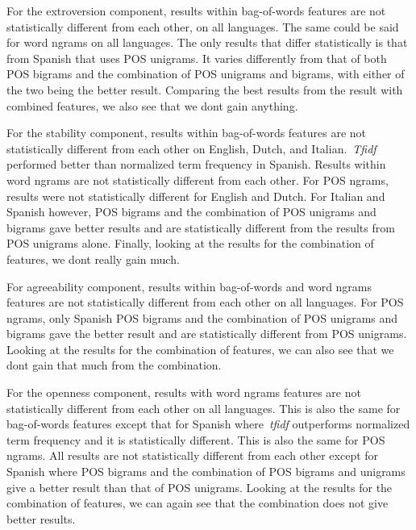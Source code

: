 \documentclass[a4paper]{llncs}
\begin{document}
For the extroversion component, results within bag-of-words features are not statistically different from each other, on all languages. The same could be said for word ngrams on all languages. The only results that differ statistically is that from Spanish that uses POS unigrams. It varies differently from that of both POS bigrams and the combination of POS unigrams and bigrams, with either of the two being the better result. Comparing the best results from the result with combined features, we also see that we dont gain anything. 

For the stability component, results within bag-of-words features are not statistically different from each other on English, Dutch, and Italian.~\textit{Tfidf} performed better than normalized term frequency in Spanish. Results within word ngrams are not statistically different from each other. For POS ngrams, results were not statistically different for English and Dutch. For Italian and Spanish however, POS bigrams and the combination of POS unigrams and bigrams gave better results and are statistically different from the results from POS unigrams alone. Finally, looking at the results for the combination of features, we dont really gain much. 

For agreeability component, results within bag-of-words and word ngrams features are not statistically different from each other on all languages. For POS ngrams, only Spanish POS bigrams and the combination of POS unigrams and bigrams gave the better result and are statistically different from POS unigrams. Looking at the results for the combination of features, we can also see that we dont gain that much from the combination. 

For the openness component, results with word ngrams features are not statistically different from each other on all languages. This is also the same for bag-of-words features except that for Spanish where~\textit{tfidf} outperforms normalized term frequency and it is statistically different. This is also the same for POS ngrams. All results are not statistically different from each other except for Spanish where POS bigrams and the combination of POS bigrams and unigrams give a better result than that of POS unigrams. Looking at the results for the combination of features, we can again see that the combination does not give better results. 
\end{document}
